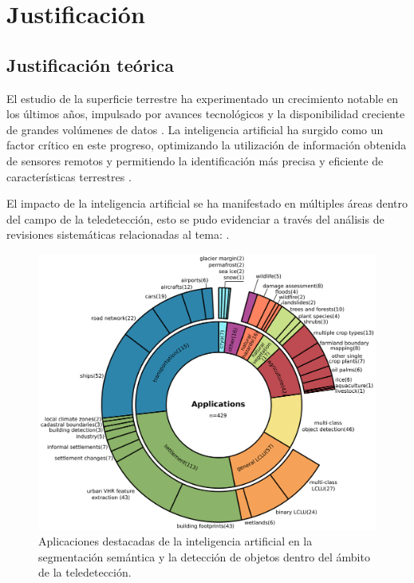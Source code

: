 \section{Justificación}
\label{sec:Justificacion}

\subsection{Justificación teórica}

El estudio de la superficie terrestre ha experimentado un crecimiento notable en los últimos años, impulsado por avances tecnológicos y la disponibilidad creciente de grandes volúmenes de datos \cite{hoeser2020object2}. La inteligencia artificial ha surgido como un factor crítico en este progreso, optimizando la utilización de información obtenida de sensores remotos y permitiendo la identificación más precisa y eficiente de características terrestres \cite{hoeser2020object}.

El impacto de la inteligencia artificial se ha manifestado en múltiples áreas dentro del campo de la teledetección, esto se pudo evidenciar a través del análisis de revisiones sistemáticas relacionadas al tema: .

\begin{figure}[H]
    \begin{center}
    \includegraphics[width=1\textwidth]{Images/RevisionAreas.png}
    \end{center}
    \caption{Aplicaciones destacadas de la inteligencia artificial en la segmentación semántica y la detección de objetos dentro del ámbito de la teledetección.}
    \label{fig:RevisionAreas}
\end{figure}

